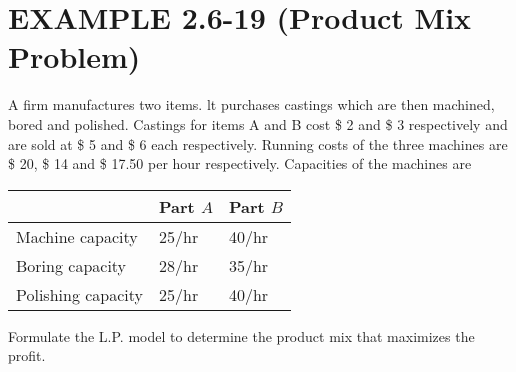 \hypertarget{example-2.6-19-product-mix-problem}{%
\section{EXAMPLE 2.6-19 (Product Mix
Problem)}\label{example-2.6-19-product-mix-problem}}

A firm manufactures two items. lt purchases castings which are then
machined, bored and polished. Castings for items A and B cost \$ 2 and
\$ 3 respectively and are sold at \$ 5 and \$ 6 each respectively.
Running costs of the three machines are \$ 20, \$ 14 and \$ 17.50 per
hour respectively. Capacities of the machines are

\begin{longtable}[]{@{}lll@{}}
\toprule
& Part \(A\) & Part \(B\) \\
\midrule
\endhead
Machine capacity & 25/hr & 40/hr \\
Boring capacity & 28/hr & 35/hr \\
Polishing capacity & 25/hr & 40/hr \\
\bottomrule
\end{longtable}

Formulate the L.P. model to determine the product mix that maximizes the
profit.
